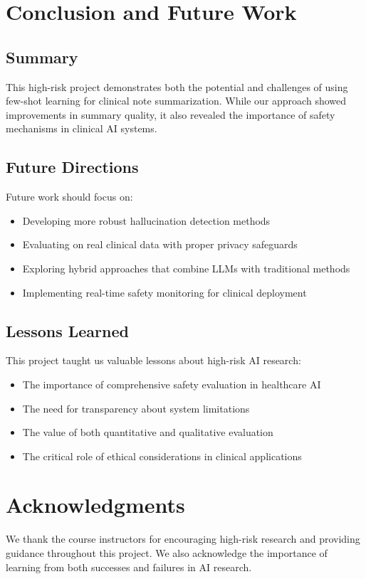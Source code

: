 \documentclass[sigconf]{acmart}
\begin{document}
\section{Conclusion and Future Work}

\subsection{Summary}

This high-risk project demonstrates both the potential and challenges of using few-shot learning for clinical note summarization. While our approach showed improvements in summary quality, it also revealed the importance of safety mechanisms in clinical AI systems.

\subsection{Future Directions}

Future work should focus on:
\begin{itemize}
    \item Developing more robust hallucination detection methods
    \item Evaluating on real clinical data with proper privacy safeguards
    \item Exploring hybrid approaches that combine LLMs with traditional methods
    \item Implementing real-time safety monitoring for clinical deployment
\end{itemize}

\subsection{Lessons Learned}

This project taught us valuable lessons about high-risk AI research:
\begin{itemize}
    \item The importance of comprehensive safety evaluation in healthcare AI
    \item The need for transparency about system limitations
    \item The value of both quantitative and qualitative evaluation
    \item The critical role of ethical considerations in clinical applications
\end{itemize}

\section*{Acknowledgments}

We thank the course instructors for encouraging high-risk research and providing guidance throughout this project. We also acknowledge the importance of learning from both successes and failures in AI research.
\end{document}
